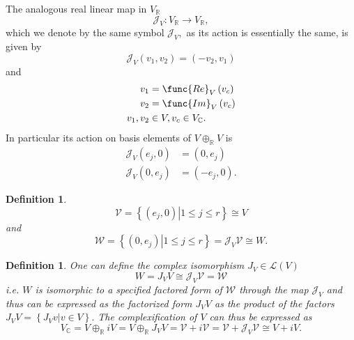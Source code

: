 \documentclass[aps,preprint]{revtex4}
\newtheorem{definition}[theorem]{Definition}
\begin{document}
The analogous real linear map in $V_{\mathbb{R}}$ 
\begin{equation}
\mathcal{J}_{V}:V_{\mathbb{R}}\rightarrow V_{\mathbb{R}},
\end{equation}%
which we denote by the same symbol $\mathcal{J}_{V},$ as its action is
essentially the same, is given by 
\begin{equation}
\mathcal{J}_{V}\left( v_{1},v_{2}\right) =\left( -v_{2},v_{1}\right)
\end{equation}%
and 
\begin{align}
v_{1}& =\func{Re}_{V}\left( v_{c}\right) \\
v_{2}& =\func{Im}_{V}\left( v_{c}\right) \\
v_{1},v_{2}& \in V,v_{c}\in V_{\mathbb{C}}.
\end{align}%
In particular its action on basis elements of $V\oplus _{\mathbb{R}}V$ is 
\begin{align}
\mathcal{J}_{V}\left( e_{j},0\right) & =\left( 0,e_{j}\right) \\
\mathcal{J}_{V}\left( 0,e_{j}\right) & =\left( -e_{j},0\right) .
\end{align}

\begin{definition}
\begin{equation}
\mathcal{V}=\left\{ \left. \left( e_{j},0\right) \right\vert 1\leq j\leq
r\right\} \cong V
\end{equation}%
and 
\begin{equation}
\mathcal{W}=\left\{ \left. \left( 0,e_{j}\right) \right\vert 1\leq j\leq
r\right\} =\mathcal{J}_{V}\mathcal{V}\cong W.
\end{equation}
\end{definition}

\begin{definition}
One can define the complex isomorphism $J_{V}\in \mathcal{L}\left( V\right) $
\begin{equation}
W=J_{V}V\cong \mathcal{J}_{V}\mathcal{V}=\mathcal{W}
\end{equation}%
i.e. $W$ is isomorphic to a specified factored form of $\mathcal{W}$ through
the map $\mathcal{J}_{V}$ and thus can be expressed as the factorized form $%
J_{V}V$ as the product of the factors $J_{V}V=\left\{ \left.
J_{V}v\right\vert v\in V\right\} .$ The complexification of $V$ can thus be
expressed as 
\begin{equation}
V_{\mathbb{C}}=V\oplus _{\mathbb{R}}iV=V\oplus _{\mathbb{R}}J_{V}V=\mathcal{V%
}+i\mathcal{V}=\mathcal{V}+\mathcal{J}_{V}\mathcal{V}\cong V+iV.
\end{equation}
\end{definition}
\end{document}
